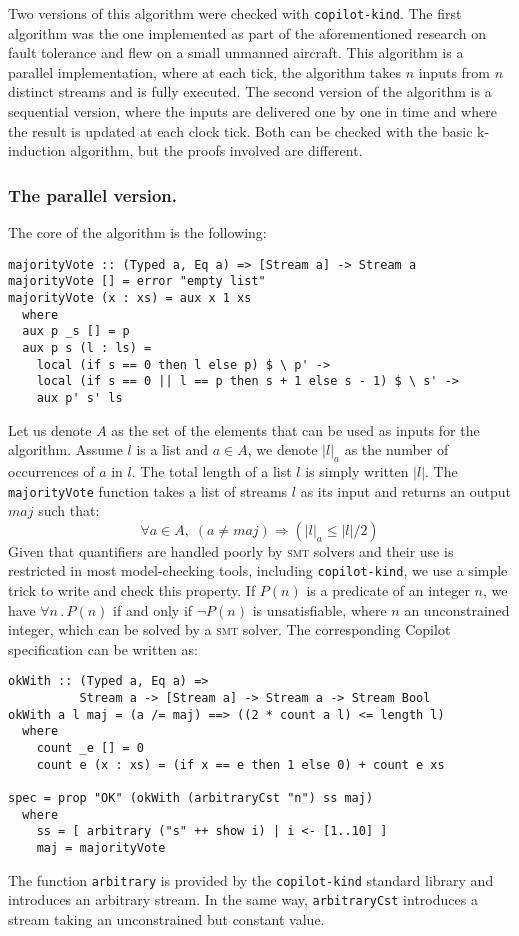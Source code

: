 

Two versions of this algorithm were checked with
\texttt{copilot-kind}. The first algorithm was the one implemented as
part of the aforementioned research on fault tolerance and flew on a
small unmanned aircraft. This algorithm 
is a parallel implementation, where at each tick, the
algorithm takes $n$ inputs from $n$ distinct streams and is fully
executed. The second version of the algorithm  is a sequential version, where the inputs are
delivered one by one in time and where the result is updated at each
clock tick. Both can be checked with the basic k-induction algorithm,
but the proofs involved are different.


\subsubsection{The parallel version.} The core of the algorithm is the
following:

\begin{lstlisting}[frame=single, deletekeywords={ls}]
majorityVote :: (Typed a, Eq a) => [Stream a] -> Stream a
majorityVote [] = error "empty list"
majorityVote (x : xs) = aux x 1 xs
  where
  aux p _s [] = p
  aux p s (l : ls) =
    local (if s == 0 then l else p) $ \ p' ->
    local (if s == 0 || l == p then s + 1 else s - 1) $ \ s' ->
    aux p' s' ls
\end{lstlisting} 
Let us denote $A$ as the set of the elements that can be used as
inputs for the algorithm.  Assume $l$ is a list and $a \in A$, we
denote $|l|_a$ as the number of occurrences of $a$ in $l$. The total
length of a list $l$ is simply written $|l|$. The
\texttt{majorityVote} function takes a list of streams $l$ as its
input and returns an output $maj$ such that: \[ \forall a \in A, \;
\left( a \neq maj \right) \Longrightarrow \left(|l|_a \leq |l| /
  {2}\right) \] Given that quantifiers are handled poorly by \textsc{smt}
solvers and their use is restricted in most model-checking tools,
including \texttt{copilot-kind}, we use a simple trick to write
and check this property.  If $P(n)$ is a predicate of an integer $n$,
we have $\forall n \, . \, P(n)$ if and only if $\neg P(n)$ is
unsatisfiable, where $n$ an unconstrained integer, which can be solved
by a \textsc{smt} solver. The corresponding Copilot specification can be
written as:
\begin{lstlisting}[frame=single]
okWith :: (Typed a, Eq a) => 
          Stream a -> [Stream a] -> Stream a -> Stream Bool
okWith a l maj = (a /= maj) ==> ((2 * count a l) <= length l)
  where
    count _e [] = 0
    count e (x : xs) = (if x == e then 1 else 0) + count e xs

spec = prop "OK" (okWith (arbitraryCst "n") ss maj)
  where
    ss = [ arbitrary ("s" ++ show i) | i <- [1..10] ]
    maj = majorityVote
\end{lstlisting}
The function \texttt{arbitrary} is provided by the \texttt{copilot-kind} standard library and introduces an arbitrary stream. In the same way, \texttt{arbitraryCst} introduces a stream taking an unconstrained but constant value.

